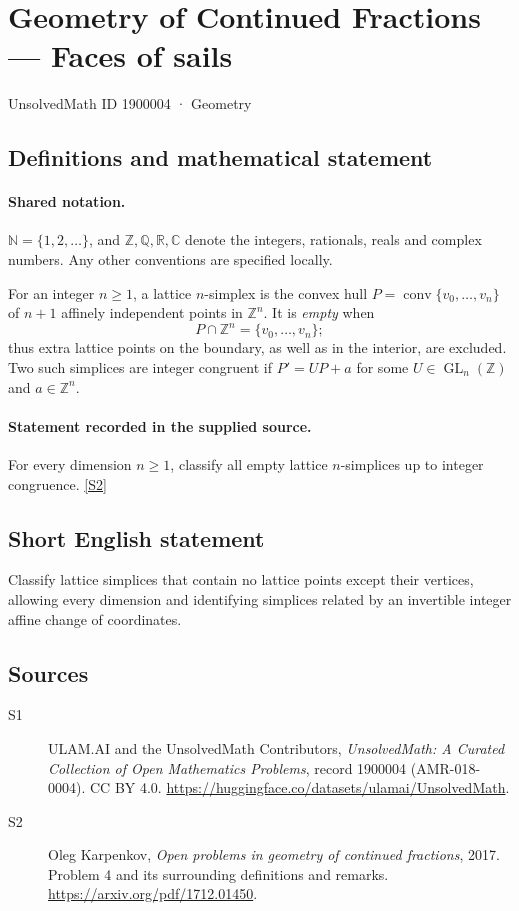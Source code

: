 \documentclass[11pt]{book}
\newcommand{\sref}[2]{\hyperlink{source:#1:#2}{[S#2]}}
\begin{document}
\setcounter{section}{1900003}
\section{Geometry of Continued Fractions — Faces of sails}\label{1900004}
{\small\sffamily UnsolvedMath ID 1900004 · Geometry}
\subsection{Definitions and mathematical statement}

\paragraph{Shared notation.}$\mathbb N=\{1,2,\ldots\}$, and $\mathbb Z,\mathbb Q,\mathbb R,\mathbb C$ denote the integers, rationals, reals and complex numbers. Any other conventions are specified locally.


For an integer $n\ge1$, a lattice $n$-simplex is the convex hull $P=\operatorname{conv}\{v_0,\ldots,v_n\}$ of $n+1$ affinely independent points in $\mathbb Z^n$. It is \emph{empty} when
\[P\cap\mathbb Z^n=\{v_0,\ldots,v_n\};\]
thus extra lattice points on the boundary, as well as in the interior, are excluded. Two such simplices are integer congruent if $P'=UP+a$ for some $U\in\operatorname{GL}_n(\mathbb Z)$ and $a\in\mathbb Z^n$.
\paragraph{Statement recorded in the supplied source.}
For every dimension $n\ge1$, classify all empty lattice $n$-simplices up to integer congruence. \sref{1900004}{2}
\subsection{Short English statement}
Classify lattice simplices that contain no lattice points except their vertices, allowing every dimension and identifying simplices related by an invertible integer affine change of coordinates.
\subsection{Sources}
\begin{description}
\item[\hypertarget{source:1900004:1}{S1}] ULAM.AI and the UnsolvedMath Contributors, \emph{UnsolvedMath: A Curated Collection of Open Mathematics Problems}, record 1900004 (AMR-018-0004). CC BY 4.0. \url{https://huggingface.co/datasets/ulamai/UnsolvedMath}.
\item[\hypertarget{source:1900004:2}{S2}] Oleg Karpenkov, \emph{Open problems in geometry of continued fractions}, 2017. Problem 4 and its surrounding definitions and remarks. \url{https://arxiv.org/pdf/1712.01450}.
\end{description}
\label{end:1900004}
\end{document}
